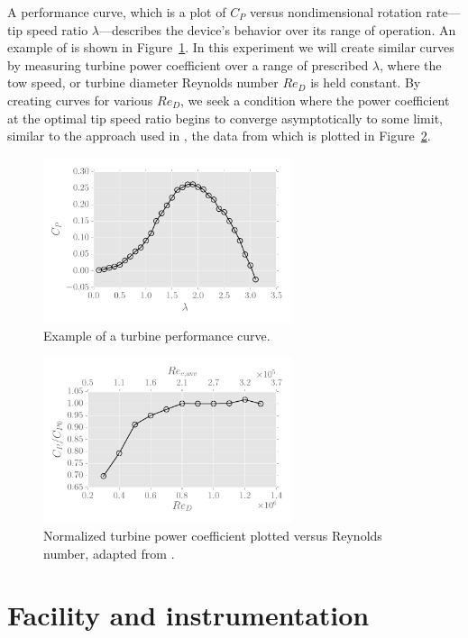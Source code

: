 \documentclass[12pt,letterpaper]{scrreprt}
\begin{document}
A performance curve, which is a plot of $C_P$ versus nondimensional rotation
rate---tip speed ratio $\lambda$---describes the device's behavior over its
range of operation. An example of is shown in Figure~\ref{fig-cp}. In this
experiment we will create similar curves by measuring turbine power coefficient
over a range of prescribed $\lambda$, where the tow speed, or turbine diameter
Reynolds number $Re_D$ is held constant. By creating curves for various $Re_D$,
we seek a condition where the power coefficient at the optimal tip speed ratio
begins to converge asymptotically to some limit, similar to the approach used in
\cite{Bachant2014}, the data from which is plotted in
Figure~\ref{fig-cp_re_dep}.

\begin{figure}[ht]
\centering
\includegraphics[width=0.65\textwidth]{Figures/cp_vs_tsr.pdf}
\caption{Example of a turbine performance curve.}
\label{fig-cp}
\end{figure}

\begin{figure}[ht]
\centering
\includegraphics[width=0.65\textwidth]{Figures/re_dep_cp.pdf}
\caption{Normalized turbine power coefficient plotted versus Reynolds number, adapted from \cite{Bachant2014}.}
\label{fig-cp_re_dep}
\end{figure}

\section{Facility and instrumentation}
\end{document}
